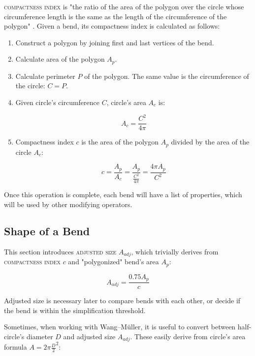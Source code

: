 \documentclass[a4paper]{article}
\newcommand{\WM}{Wang--M{\"u}ller}
\begin{document}
\textsc{compactness index} is "the ratio of the area of the polygon over the
circle whose circumference length is the same as the length of the
circumference of the polygon" \cite{wang1998line}. Given a bend, its
compactness index is calculated as follows:

\begin{enumerate}

  \item Construct a polygon by joining first and last vertices of the bend.

  \item Calculate area of the polygon $A_{p}$.

  \item Calculate perimeter $P$ of the polygon. The same value is the
      circumference of the circle: $C = P$.

    \item Given circle's circumference $C$, circle's area $A_{c}$ is:

    \[
      A_c = \frac{C^2}{4\pi}
    \]

  \item Compactness index $c$ is the area of the polygon $A_p$ divided by the
      area of the circle $A_c$:

    \[
      c = \frac{A_p}{A_c} =
          \frac{A_p}{ \frac{C^2}{4\pi} } =
          \frac{4\pi A_p}{C^2}
    \]

\end{enumerate}

Once this operation is complete, each bend will have a list of properties,
which will be used by other modifying operators.

\subsection{Shape of a Bend}
\label{sec:shape-of-a-bend}

This section introduces \textsc{adjusted size} $A_{adj}$, which trivially
derives from \textsc{compactness index} $c$ and "polygonized" bend's area $A_{p}$:

\[
  A_{adj} = \frac{0.75 A_{p}}{c}
\]

Adjusted size is necessary later to compare bends with each other, or decide if
the bend is within the simplification threshold.

Sometimes, when working with {\WM}, it is useful to convert between
half-circle's diameter $D$ and adjusted size $A_{adj}$. These easily derive
from circle's area formula $A = 2\pi \frac{D}{2}^2$:
\end{document}
